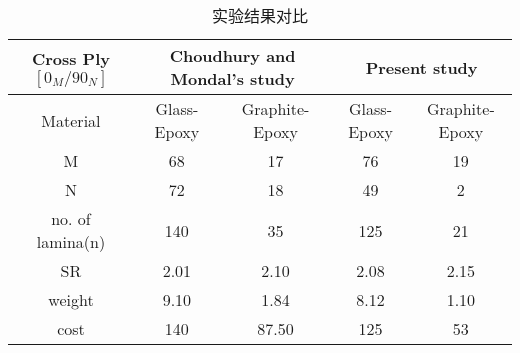 \begin{table}
\caption{实验结果对比}
\centering
\begin{adjustbox}{width=1\textwidth}
	\begin{tabular}{c|cc|cc}
		\toprule
		Cross Ply $[0_M/90_N]$         & \multicolumn{2}{c}{Choudhury and Mondal's study} & \multicolumn{2}{c}{Present study} \\
		\midrule																								  
		 Material       &  Glass-Epoxy & Graphite-Epoxy  & Glass-Epoxy & Graphite-Epoxy      \\ 
			  M         &  68          &    17           &  76		    &  19             \\
			  N         &  72          &    18           &  49		    &  2              \\
	no. of lamina(n)    &  140         &    35           &  125	        &  21                     \\
			 SR         &  2.01        &    2.10         &  2.08	    &  2.15            \\
		 weight         &  9.10        &    1.84         &  8.12	    &  1.10           \\
		 cost           &  140         &    87.50        &  125	        &  53           \\
		\bottomrule
	\end{tabular}
\end{adjustbox}
\label{tab:comparsion}
\end{table}
